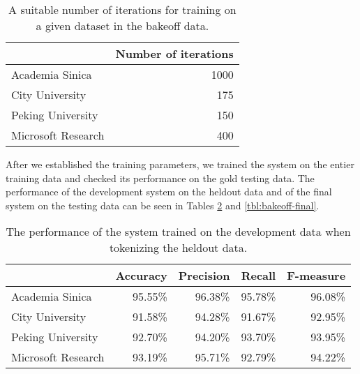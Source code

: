 \begin{table}
  \begin{center}
    \begin{tabular}{ | l | r | }
      \hline
      & Number of iterations \\ \hline
      Academia Sinica & 1000 \\ \hline
      City University & 175 \\ \hline
      Peking University & 150 \\ \hline
      Microsoft Research & 400 \\
      \hline
    \end{tabular}
  \end{center}
  \caption[Recommended iterations for Chinese segmentation]{A suitable number of iterations for training on a given dataset in
           the bakeoff data.}
  \label{tbl:bakeoff-iters}
\end{table}

After we established the training parameters, we trained the system on the
entier training data and checked its performance on the gold testing data. The
performance of the development system on the heldout data and of the final
system on the testing data can be seen in Tables \ref{tbl:bakeoff-devel} and
\ref{tbl:bakeoff-final}.

\begin{table}
  \begin{center}
    \begin{tabular}{ | l | r | r | r | r | }
      \hline
      & Accuracy & Precision & Recall & F-measure \\ \hline
      Academia Sinica & 95.55\% & 96.38\% & 95.78\% & 96.08\% \\ \hline
      City University & 91.58\% & 94.28\% & 91.67\% & 92.95\% \\ \hline
      Peking University & 92.70\% & 94.20\% & 93.70\% & 93.95\% \\ \hline
      Microsoft Research & 93.19\% & 95.71\% & 92.79\% & 94.22\% \\
      \hline
    \end{tabular}
  \end{center}
  \caption[Development performance of Chinese segmenter]{The performance of the system trained on the development data when
           tokenizing the heldout data.}
  \label{tbl:bakeoff-devel}
\end{table}

